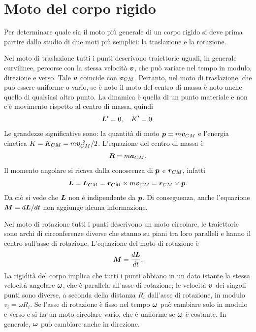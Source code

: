 \section{Moto del corpo rigido}
Per determinare quale sia il moto più generale di un corpo rigido si deve prima partire dallo studio di due moti più semplici: la traslazione e la rotazione. 

Nel moto di traslazione tutti i punti descrivono traiettorie uguali, in generale curvilinee, percorse con la stessa velocità $\bm{v}$, che può variare nel tempo in modulo, direzione e verso. Tale $\bm{v}$ coincide con $\bm{v}_{CM}$. Pertanto, nel moto di traslazione, che può essere uniforme o vario, se è noto il moto del centro di massa è noto anche quello di qualsiasi altro punto. La dinamica è quella di un punto materiale e non c'è movimento rispetto al centro di massa, quindi
\begin{equation}
    \bm{L}'=0,\quad K'=0.
\end{equation}
Le grandezze significative sono: la quantità di moto $\bm{p}=m\bm{v}_{CM}$ e l'energia cinetica $K=K_{CM}=m\bm{v}_{CM}^{\ 2}/2$. L'equazione del centro di massa è
\begin{equation}
    \bm{R}=m\bm{a}_{CM}.
\end{equation}
Il momento angolare si ricava dalla conoscenza di $\bm{p}$ e $\bm{r}_{CM}$, infatti
\begin{equation}
    \bm{L}=\bm{L}_{CM}=\bm{r}_{CM}\times m\bm{v}_{CM}=\bm{r}_{CM}\times\bm{p}.
\end{equation}
Da ciò si vede che $\bm{L}$ non è indipendente da $\bm{p}$. Di conseguenza, anche l'equazione $\bm{M}=d\bm{L}/dt$ non aggiunge alcuna informazione.

Nel moto di rotazione tutti i punti descrivono un moto circolare, le traiettorie sono archi di circonferenze diverse che stanno su piani tra loro paralleli e hanno il centro sull'asse di rotazione.
L'equazione del moto di rotazione è
\begin{equation}
\label{eq: eq. moto rotazione corpo rigido}
    \bm{M}=\frac{d\bm{L}}{dt}.
\end{equation}
La rigidità del corpo implica che tutti i punti abbiano in un dato istante la stessa velocità angolare $\bm{\omega}$, che è parallela all'asse di rotazione; le velocità $\bm{v}$ dei singoli punti sono diverse, a seconda della distanza $R_i$ dall'asse di rotazione, in modulo $v_i=\omega R_i$. Se l'asse di rotazione è fisso nel tempo $\bm{\omega}$ può cambiare solo in modulo e verso e si ha un moto circolare vario, che è uniforme se $\bm{\omega}$ è costante. In generale, $\bm{\omega}$ può cambiare anche in direzione. 

